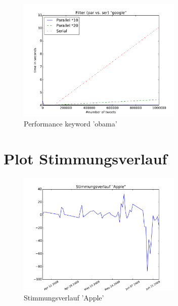 \documentclass[12pt, oneside]{report}   	%
\begin{document}
\begin{figure}[h]
\begin{center}
\includegraphics[width=0.7\textwidth]{bilder/time_filter_google.pdf}
\caption{Performance keyword 'obama'}
\label{img:performancefilter3}
\end{center}
\end{figure}

\newpage{}
\section{Plot Stimmungsverlauf}

\begin{figure}[h]
\begin{center}
\includegraphics[width=0.7\textwidth]{bilder/moodPlotApple.pdf}
\caption{Stimmungsverlauf 'Apple'}
\label{img:moodplot1}
\end{center}
\end{figure}
\end{document}
